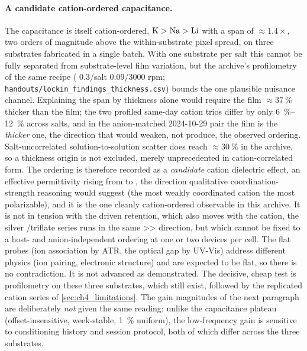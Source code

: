 \paragraph{A candidate cation-ordered capacitance.} The capacitance is
itself cation-ordered, \(\ce{K}>\ce{Na}>\ce{Li}\) with a span of
\(\approx\!1.4\times\), two orders of magnitude above the within-substrate
pixel spread, on three substrates fabricated in a single batch. With one
substrate per salt this cannot be fully separated from substrate-level film
variation, but the archive's profilometry of the same recipe (\TMPE{}
\num{0.3}/salt \num{0.09}/\num{3000} rpm;
\texttt{handouts/lockin\_findings\_thickness.csv}) bounds the one plausible
nuisance channel. Explaining the span by thickness alone would require the
 film \(\approx\!\SI{37}{\percent}\) thicker than the  film;
the two profiled same-day cation trios differ by only
\SIrange{6}{12}{\percent} across salts, and in the anion-matched 2024-10-29
pair the  film is the \emph{thicker} one, the direction that would
weaken, not produce, the observed ordering. Salt-uncorrelated
solution-to-solution scatter does reach \(\approx\!\SI{30}{\percent}\) in
the archive, so a thickness origin is not excluded, merely unprecedented in
cation-correlated form. The ordering is therefore recorded as a
\emph{candidate} cation dielectric effect, an effective permittivity
rising from  to , the direction qualitative
coordination-strength reasoning would suggest (the most weakly coordinated
cation the most polarizable), and it is the one cleanly cation-ordered observable
in this archive. It is not in tension with the driven retention, which also
moves with the cation, the silver \TMPE{}/triflate series runs in the same
>> direction, but which cannot be fixed to a
host- and anion-independent ordering at one or two devices per cell. The flat
probes (ion association by ATR, the optical gap by UV-Vis) address different
physics (ion pairing, electronic structure) and are expected to be flat, so
there is no contradiction. It is not advanced as demonstrated. The decisive, cheap test
is profilometry on these three substrates, which still exist, followed by
the replicated cation series of \cref{sec:ch4_limitations}. The gain
magnitudes of the next paragraph are deliberately \emph{not} given the same
reading: unlike the capacitance plateau (offset-insensitive, week-stable,
\SI{1}{\percent} uniform), the low-frequency gain is sensitive to
conditioning history and session protocol, both of which differ across the
three substrates.

